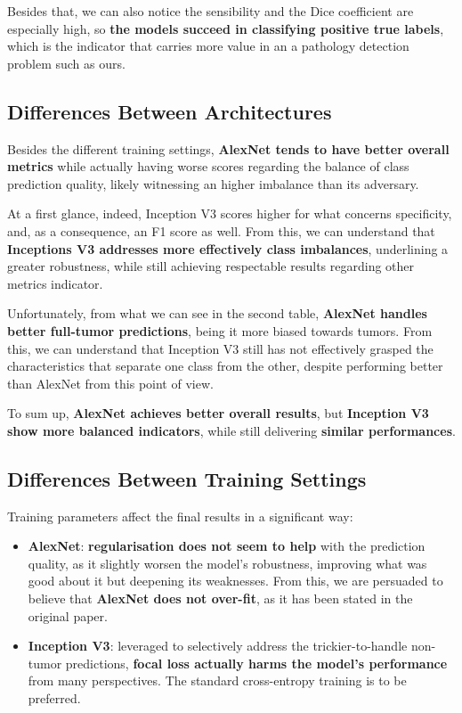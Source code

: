 \par Besides that, we can also notice the sensibility and the Dice coefficient are especially high, so \textbf{the models succeed in classifying positive true labels}, which is the indicator that carries more value in an a pathology detection problem such as ours.

\subsection{Differences Between Architectures}

\par
Besides the different training settings, \textbf{AlexNet tends to have better overall metrics} while actually having worse scores regarding the balance of class prediction quality, likely witnessing an higher imbalance than its adversary.

\par
At a first glance, indeed, Inception V3 scores higher for what concerns specificity, and, as a consequence, an F1 score as well. From this, we can understand that \textbf{Inceptions V3 addresses more effectively class imbalances}, underlining a greater robustness, while still achieving respectable results regarding other metrics indicator.

\par
Unfortunately, from what we can see in the second table, \textbf{AlexNet handles better full-tumor predictions}, being it more biased towards tumors. From this, we can understand that Inception V3 still has not effectively grasped the characteristics that separate one class from the other, despite performing better than AlexNet from this point of view.

\par To sum up, \textbf{AlexNet achieves better overall results}, but \textbf{Inception V3 show more balanced indicators}, while still delivering \textbf{similar performances}.

\subsection{Differences Between Training Settings}

Training parameters affect the final results in a significant way:

\begin{itemize}
    \item \textbf{AlexNet}: \textbf{regularisation does not seem to help} with the prediction quality, as it slightly worsen the model's robustness, improving what was good about it but deepening its weaknesses. From this, we are persuaded to believe that \textbf{AlexNet does not over-fit}, as it has been stated in the original paper.

    \item \textbf{Inception V3}: leveraged to selectively address the trickier-to-handle non-tumor predictions, \textbf{focal loss actually harms the model's performance} from many perspectives. The standard cross-entropy training is to be preferred.
\end{itemize}

